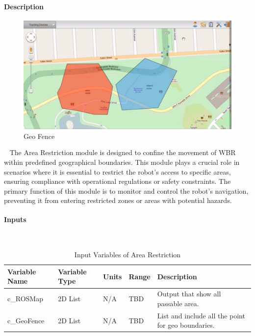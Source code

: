 \documentclass[12pt]{article}
\begin{document}
            \paragraph{Description}
                \begin{figure}[H]
                    \centering
                    \includegraphics[width=\textwidth,height=\textheight,keepaspectratio]{../GeoFence.jpg}
                    \caption{Geo Fence}
                \end{figure}  
                ~\newline
                The Area Restriction module is designed to confine the movement of WBR  within predefined geographical boundaries. This module plays a crucial role in scenarios where it is essential to restrict the robot's access to specific areas, ensuring compliance with operational regulations or safety constraints. The primary function of this module is to monitor and control the robot's navigation, preventing it from entering restricted zones or areas with potential hazards.\\ 
            \paragraph{Inputs}
                ~\newline
                \begin{table}[H]
                  \centering
                    \caption{Input Variables of Area Restriction} 
                    \label{tbl:Input Variables of Area Restriction}
                  \begin{tabularx}{\textwidth}{|p{5cm}|p{1.2cm}|p{1.2cm}|p{1cm}|X|}
                    \hline Variable Name & Variable Type & Units & Range & Description \\
                    \hline c\_ROSMap & 2D List & N/A & TBD & Output that show all passable area.\\
                    \hline c\_GeoFence & 2D List & N/A & TBD & List and include all the point for geo boundaries.\\
                    \hline
                  \end{tabularx}
                \end{table} 
                
\end{document}
